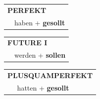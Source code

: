 \documentclass[10pt,a4paper]{revtex4-2}
\begin{document}
\begin{verbbox-modal}
    \vspace{10pt}
 
    \begin{tabular}{rl}
     \multicolumn{2}{l}{\textbf{PERFEKT}}\\
  &  haben + \textbf{gesollt}\\
  \end{tabular}
\hfill
   \begin{tabular}{rl}
   
    \multicolumn{2}{l}{\textbf{FUTURE I} }\\
  &  werden + \textbf{sollen}\\
 
  \end{tabular}
\hfill
   \begin{tabular}{rl}
      \multicolumn{2}{l}{\textbf{PLUSQUAMPERFEKT}}\\
  &  hatten + \textbf{gesollt}\\
  \end{tabular}
  
  \vspace{-5pt}

\end{verbbox-modal}
\end{document}
